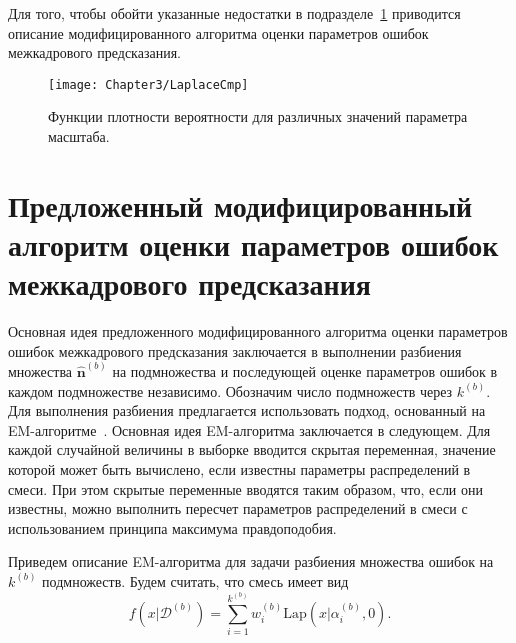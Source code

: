 Для того, чтобы обойти указанные недостатки в подразделе~\ref{chap:CNM:ProposedAlgo} приводится описание модифицированного алгоритма оценки параметров ошибок межкадрового предсказания.


\begin{figure}[htbp]
    \centering
    \texttt{[image: Chapter3/LaplaceCmp]}
    \caption{Функции плотности вероятности для различных значений параметра масштаба.}
    \label{fig:chapCNM:LaplaceCmp}
\end{figure}

\section{Предложенный модифицированный алгоритм оценки параметров ошибок межкадрового предсказания}
\label{chap:CNM:ProposedAlgo}

Основная идея предложенного модифицированного алгоритма оценки параметров ошибок межкадрового предсказания заключается в выполнении разбиения множества $\hat{\mathbf{n}}^{(b)}$ на подмножества и последующей оценке параметров ошибок в каждом подмножестве независимо. Обозначим число подмножеств через $k^{(b)}$. Для выполнения разбиения предлагается использовать подход, основанный на EM-алгоритме~\cite{Bishop:2006:PRM:1162264}. Основная идея EM-алгоритма заключается в следующем. Для каждой случайной величины в выборке вводится скрытая переменная, значение которой может быть вычислено, если известны параметры распределений в смеси. При этом скрытые переменные вводятся таким образом, что, если они известны, можно выполнить пересчет параметров распределений в смеси с использованием принципа максимума правдоподобия.

Приведем описание EM-алгоритма для задачи разбиения множества ошибок на $k^{(b)}$ подмножеств. Будем считать, что смесь имеет вид
\begin{equation}
f(x \vert \mathcal{D}^{(b)}) = \sum\limits_{i=1}^{k^{(b)}} w_i^{(b)} \mathrm{Lap}(x \vert \alpha^{(b)}_{i} ,0).
\label{eq:Mixture}
\end{equation}

